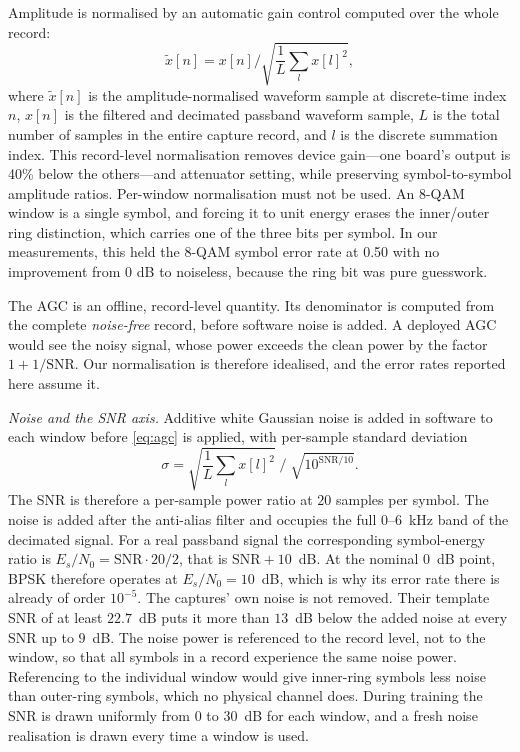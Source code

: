 \documentclass{ieeeaccess}
\begin{document}
Amplitude is normalised by an automatic gain control computed over the whole record:
\begin{equation}
\tilde{x}[n] = x[n] \big/ \sqrt{\textstyle\frac{1}{L}\sum_{l} x[l]^2 } ,
\label{eq:agc}
\end{equation}
where $\tilde{x}[n]$ is the amplitude-normalised waveform sample at discrete-time index $n$, $x[n]$ is the filtered and decimated passband waveform sample, $L$ is the total number of samples in the entire capture record, and $l$ is the discrete summation index. This record-level normalisation removes device gain---one board's output is 40\% below the others---and attenuator setting, while preserving symbol-to-symbol amplitude ratios. Per-window normalisation must not be used. An 8-QAM window is a single symbol, and forcing it to unit energy erases the inner/outer ring distinction, which carries one of the three bits per symbol. In our measurements, this held the 8-QAM symbol error rate at 0.50 with no improvement from 0 dB to noiseless, because the ring bit was pure guesswork.

The AGC is an offline, record-level quantity. Its denominator is computed from the complete \emph{noise-free} record, before software noise is added. A deployed AGC would see the noisy signal, whose power exceeds the clean power by the factor $1+1/\mathrm{SNR}$. Our normalisation is therefore idealised, and the error rates reported here assume it.

\emph{Noise and the SNR axis.} Additive white Gaussian noise is added in software to each window before \eqref{eq:agc} is applied, with per-sample standard deviation
\begin{equation}
\sigma = \sqrt{\textstyle\frac{1}{L}\sum_{l} x[l]^2}\;\big/\;\sqrt{10^{\mathrm{SNR}/10}} .
\label{eq:noise}
\end{equation}
The SNR is therefore a per-sample power ratio at $20$ samples per symbol. The noise is added after the anti-alias filter and occupies the full $0$--$6$~kHz band of the decimated signal. For a real passband signal the corresponding symbol-energy ratio is $E_s/N_0 = \mathrm{SNR}\cdot 20/2$, that is $\mathrm{SNR}+10$~dB. At the nominal $0$~dB point, BPSK therefore operates at $E_s/N_0 = 10$~dB, which is why its error rate there is already of order $10^{-5}$. The captures' own noise is not removed. Their template SNR of at least $22.7$~dB puts it more than $13$~dB below the added noise at every SNR up to $9$~dB. The noise power is referenced to the record level, not to the window, so that all symbols in a record experience the same noise power. Referencing to the individual window would give inner-ring symbols less noise than outer-ring symbols, which no physical channel does. During training the SNR is drawn uniformly from $0$ to $30$~dB for each window, and a fresh noise realisation is drawn every time a window is used.
\end{document}
